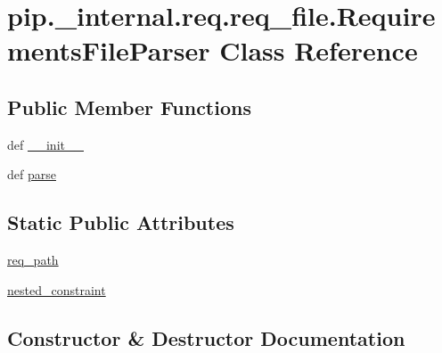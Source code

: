 \hypertarget{classpip_1_1__internal_1_1req_1_1req__file_1_1RequirementsFileParser}{}\section{pip.\+\_\+internal.\+req.\+req\+\_\+file.\+Requirements\+File\+Parser Class Reference}
\label{classpip_1_1__internal_1_1req_1_1req__file_1_1RequirementsFileParser}
\subsection*{Public Member Functions}
\begin{DoxyCompactItemize}
\item 
def \hyperlink{classpip_1_1__internal_1_1req_1_1req__file_1_1RequirementsFileParser_a686d1c44f46bba467f96277292f46d19}{\+\_\+\+\_\+init\+\_\+\+\_\+}
\item 
def \hyperlink{classpip_1_1__internal_1_1req_1_1req__file_1_1RequirementsFileParser_a8a52caf1667092f1fa2dd42894c851df}{parse}
\end{DoxyCompactItemize}
\subsection*{Static Public Attributes}
\begin{DoxyCompactItemize}
\item 
\hyperlink{classpip_1_1__internal_1_1req_1_1req__file_1_1RequirementsFileParser_a8520ef39bdabc5d0474f044f0ebbf0f9}{req\+\_\+path}
\item 
\hyperlink{classpip_1_1__internal_1_1req_1_1req__file_1_1RequirementsFileParser_a45ef1e1fc5a27d291b9e749c8a3c574c}{nested\+\_\+constraint}
\end{DoxyCompactItemize}


\subsection{Constructor \& Destructor Documentation}
\mbox{\label{classpip_1_1__internal_1_1req_1_1req__file_1_1RequirementsFileParser_a686d1c44f46bba467f96277292f46d19}} 
